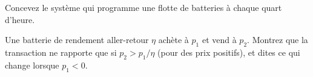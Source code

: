 \begin{interviewq}\label{iq:s2:power-and-gas-trading:5}
Concevez le système qui programme une flotte de batteries à chaque quart d'heure.
\end{interviewq}

\begin{interviewq}\label{iq:s2:power-and-gas-trading:6}
Une batterie de rendement aller-retour $\eta$ achète à $p_1$ et vend à $p_2$. Montrez que la transaction ne rapporte que si $p_2 > p_1/\eta$ (pour des
prix positifs), et dites ce qui change lorsque $p_1 < 0$.
\end{interviewq}
